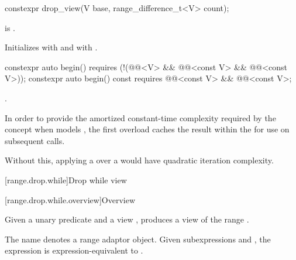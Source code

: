 %
\begin{itemdecl}
constexpr drop_view(V base, range_difference_t<V> count);
\end{itemdecl}

\begin{itemdescr}
\pnum
\expects
{} is .

\pnum
\effects
Initializes  with  and
 with .
\end{itemdescr}

%
\begin{itemdecl}
constexpr auto begin()
  requires (!(@@<V> &&
              @@<const V> && @@<const V>));
constexpr auto begin() const
  requires @@<const V> && @@<const V>;
\end{itemdecl}

\begin{itemdescr}
\pnum
\returns
{}.

\pnum
\remarks
In order to provide the amortized constant-time complexity required
by the  concept
when  models ,
the first overload caches the result within the 
for use on subsequent calls.
\begin{note}
Without this,
applying a  over a 
would have quadratic iteration complexity.
\end{note}
\end{itemdescr}

[range.drop.while]{Drop while view}

[range.drop.while.overview]{Overview}

\pnum
Given a unary predicate  and a view ,
 produces a view
of the range .

\pnum
{}%
The name 
denotes a range adaptor object.
Given subexpressions  and ,
the expression 
is expression-equivalent to .

